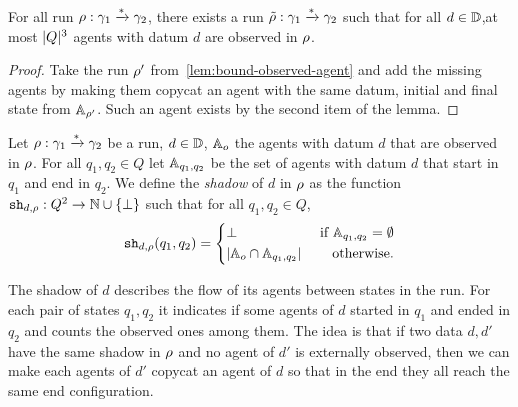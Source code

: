 \documentclass[a4paper,UKenglish,cleveref, autoref, thm-restate]{lipics-v2021}
\begin{document}
 	\begin{corollary}
 		For all run $\rho : \gamma_1 \xrightarrow{*} \gamma_2$, there exists a run $\Tilde{\rho} : \gamma_1 \xrightarrow{*} \gamma_2$ such that for all $d \in \mathbb{D}$,at most $|Q|^3$ agents with datum $d$ are observed in $\rho$.
 	\end{corollary}
 
 	\begin{proof}
 		Take the run $\rho'$ from~\cref{lem:bound-observed-agent} and add the missing agents by making them copycat an agent with the same datum, initial and final state from $\mathbb{A}_{\rho'}$. Such an agent exists by the second item of the lemma.
 	\end{proof}

	\begin{definition}
		Let $\rho : \gamma_1 \xrightarrow{*} \gamma_2$ be a run, $d\in \mathbb{D}$, $\mathbb{A}_o$ the agents with datum $d$ that are observed in $\rho$. For all $q_1, q_2 \in Q$ let $\mathbb{A}_{q_1, q_2}$ be the set of agents with datum $d$ that start in $q_1$ and end in $q_2$.
		We define the \emph{shadow} of $d$ in $\rho$ as the function $\mathtt{sh}_{d,\rho} : Q^2 \to \mathbb{N} \cup \{\bot\}$ such that for all $q_1, q_2 \in Q$, 
		\begin{equation}
			\mathtt{sh}_{d,\rho}(q_1, q_2) = 
			\left\{
			\begin{aligned}
				&\bot &\text{ if } \mathbb{A}_{q_1,q_2} =\emptyset\\
				&|\mathbb{A}_o \cap \mathbb{A}_{q_1, q_2}| &\text{ otherwise.}
			\end{aligned}
			\right.
		\end{equation}
	\end{definition}
%	
	The shadow of $d$ describes the flow of its agents between states in the run. For each pair of states $q_1, q_2$ it indicates if some agents of $d$ started in $q_1$ and ended in $q_2$ and counts the observed ones among them. The idea is that if two data $d, d'$ have the same shadow in $\rho$ and no agent of $d'$ is externally observed, then we can make each agents of $d'$ copycat an agent of $d$ so that in the end they all reach the same end configuration.
\end{document}

